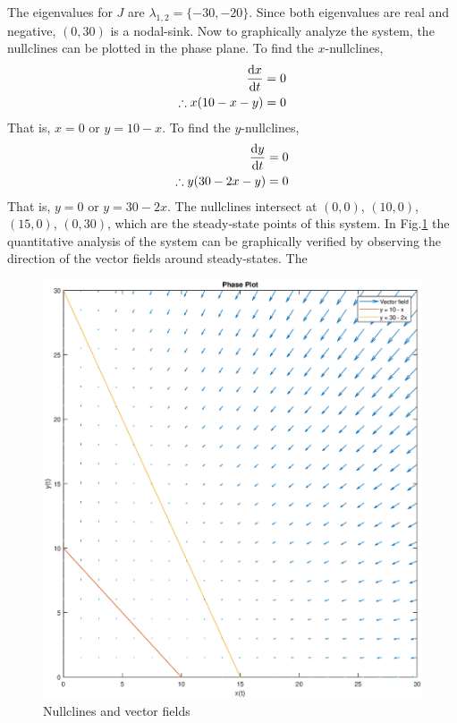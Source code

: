 \documentclass[12pt,1in]{article}
\newenvironment{Example}[2][Example]{\begin{trivlist}
		\item[\hskip \labelsep {\bfseries #1}\hskip \labelsep {\bfseries #2.}]}{\end{trivlist}}
\begin{document}
\begin{Example}{1}
The eigenvalues for $J$ are $\lambda_{1,2} = \{-30, -20\}$. Since both eigenvalues are real and negative, $(0,30)$ is a nodal-sink. 
Now to graphically analyze the system, the nullclines can be plotted in the phase plane.
To find the $x$-nullclines,
\begin{align*}
\derivative{x}{t} &= 0\\
\therefore x(10 - x -y) &= 0
\end{align*}
That is, $x = 0$ or $y = 10 - x$. 
To find the $y$-nullclines,
\begin{align*}
\derivative{y}{t} &= 0\\
\therefore y(30 - 2x - y) &= 0
\end{align*}
That is, $y = 0$ or $y = 30 - 2x$. 
The nullclines intersect at $(0,0)$, $(10,0)$, $(15,0)$, $(0,30)$, which are the steady-state points of this system. In Fig.\ref{fig:example1} the quantitative analysis of the system can be graphically verified by observing the direction of the vector fields around steady-states. 
The 
\begin{figure}[H]
	\centering
	\includegraphics[width=\linewidth,height=.85\linewidth]{Figures/example_1}
	\caption{Nullclines and vector fields}
	\label{fig:example1}
\end{figure}

\end{Example}
\end{document}
